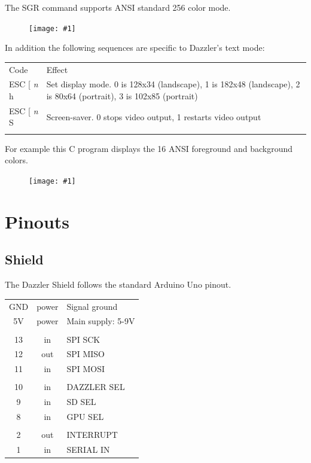 \documentclass{article}
\newcommand{\eg}[1]{
\begin{framed}

\end{framed}
}
\newcommand{\heavyline}{\specialrule{1pt}{1pt}{1pt}}
\newcommand{\pngw}[2]{
\begin{figure}[H]
\begin{center}
\texttt{[image: \#1]}
\end{center}
\end{figure}
}
\newcommand{\gap}{\vspace{10pt}}
\begin{document}
The SGR command supports ANSI standard 256 color mode.

\pngw{img/gameduino-3x-dazzler/textmode256}{1.0}

In addition the following sequences are specific to Dazzler's text mode:

\gap
\noindent
\begin{tabularx}{\linewidth}{lX}
\heavyline
Code & Effect \\ \heavyline

ESC {[} \emph{n} h & 
Set display mode.  0 is 128x34 (landscape), 1 is 182x48 (landscape), 2 is 80x64 (portrait), 3 is 102x85 (portrait)
\\

ESC {[} \emph{n} S & Screen-saver.  0 stops video output, 1 restarts video output
\\ \heavyline
\end{tabularx}
\gap

\newpage
\noindent
For example this C program displays the 16 ANSI foreground and background colors.

\eg{dazzler-color1}

\pngw{img/gameduino-3x-dazzler/textmode-arduino}{0.8}

\newpage
\section{Pinouts}

\newcommand{\activelow}[1]{$\overline{\mbox{#1}}$}

\subsection{Shield}
The Dazzler Shield follows the standard Arduino Uno pinout.

\gap
\begin{center}
\begin{tabular}{ccl}
\hline
GND	& power & Signal ground \\
5V	& power	& Main supply: 5-9V \\
\\
13	& in	& SPI SCK \\
12	& out	& SPI MISO \\
11	& in	& SPI MOSI \\
\\
10	& in	& DAZZLER SEL \\
9	& in	& SD SEL \\
8	& in	& GPU SEL \\
\\
2	& out	& INTERRUPT \\
1	& in 	& SERIAL IN \\
\hline
\end{tabular}
\end{center}
\gap
\end{document}

